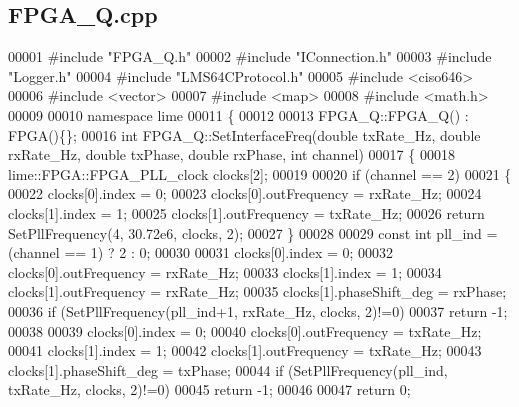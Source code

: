 \subsection{F\+P\+G\+A\+\_\+\+Q.\+cpp}
\label{FPGA__Q_8cpp_source}

\begin{DoxyCode}
00001 \textcolor{preprocessor}{#include "FPGA_Q.h"}
00002 \textcolor{preprocessor}{#include "IConnection.h"}
00003 \textcolor{preprocessor}{#include "Logger.h"}
00004 \textcolor{preprocessor}{#include "LMS64CProtocol.h"}
00005 \textcolor{preprocessor}{#include <ciso646>}
00006 \textcolor{preprocessor}{#include <vector>}
00007 \textcolor{preprocessor}{#include <map>}
00008 \textcolor{preprocessor}{#include <math.h>}
00009 
00010 \textcolor{keyword}{namespace }lime
00011 \{
00012 
00013 FPGA_Q::FPGA_Q() : FPGA()\{\};
00016 \textcolor{keywordtype}{int} FPGA_Q::SetInterfaceFreq(\textcolor{keywordtype}{double} txRate\_Hz, \textcolor{keywordtype}{double} rxRate\_Hz, \textcolor{keywordtype}{double} txPhase, \textcolor{keywordtype}{double} rxPhase, \textcolor{keywordtype}{int} 
      channel)
00017 \{
00018     lime::FPGA::FPGA_PLL_clock clocks[2];
00019 
00020     \textcolor{keywordflow}{if} (channel == 2)
00021     \{
00022         clocks[0].index = 0;
00023         clocks[0].outFrequency = rxRate\_Hz;
00024         clocks[1].index = 1;
00025         clocks[1].outFrequency = txRate\_Hz;
00026         \textcolor{keywordflow}{return} SetPllFrequency(4, 30.72e6, clocks, 2);
00027     \}
00028 
00029     \textcolor{keyword}{const} \textcolor{keywordtype}{int} pll\_ind = (channel == 1) ? 2 : 0;
00030 
00031     clocks[0].index = 0;
00032     clocks[0].outFrequency = rxRate\_Hz;
00033     clocks[1].index = 1;
00034     clocks[1].outFrequency = rxRate\_Hz;
00035     clocks[1].phaseShift_deg = rxPhase;
00036     \textcolor{keywordflow}{if} (SetPllFrequency(pll\_ind+1, rxRate\_Hz, clocks, 2)!=0)
00037         \textcolor{keywordflow}{return} -1;
00038 
00039     clocks[0].index = 0;
00040     clocks[0].outFrequency = txRate\_Hz;
00041     clocks[1].index = 1;
00042     clocks[1].outFrequency = txRate\_Hz;
00043     clocks[1].phaseShift_deg = txPhase;
00044     \textcolor{keywordflow}{if} (SetPllFrequency(pll\_ind, txRate\_Hz, clocks, 2)!=0)
00045         \textcolor{keywordflow}{return} -1;
00046 
00047     \textcolor{keywordflow}{return} 0;

\end{DoxyCode}
